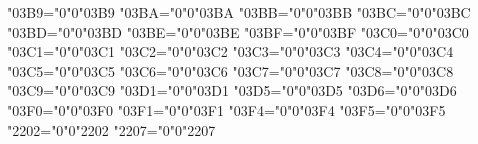{    \Umathcode"03B9="0"0"03B9%
    \Umathcode"03BA="0"0"03BA%
    \Umathcode"03BB="0"0"03BB%
    \Umathcode"03BC="0"0"03BC%
    \Umathcode"03BD="0"0"03BD%
    \Umathcode"03BE="0"0"03BE%
    \Umathcode"03BF="0"0"03BF%
    \Umathcode"03C0="0"0"03C0%
    \Umathcode"03C1="0"0"03C1%
    \Umathcode"03C2="0"0"03C2%
    \Umathcode"03C3="0"0"03C3%
    \Umathcode"03C4="0"0"03C4%
    \Umathcode"03C5="0"0"03C5%
    \Umathcode"03C6="0"0"03C6%
    \Umathcode"03C7="0"0"03C7%
    \Umathcode"03C8="0"0"03C8%
    \Umathcode"03C9="0"0"03C9%
    \Umathcode"03D1="0"0"03D1%
    \Umathcode"03D5="0"0"03D5%
    \Umathcode"03D6="0"0"03D6%
    \Umathcode"03F0="0"0"03F0%
    \Umathcode"03F1="0"0"03F1%
    \Umathcode"03F4="0"0"03F4%
    \Umathcode"03F5="0"0"03F5%
    \Umathcode"2202="0"0"2202%
    \Umathcode"2207="0"0"2207%
    \relax
}

\everymathmit {%
}

\everymathcal {%
}

